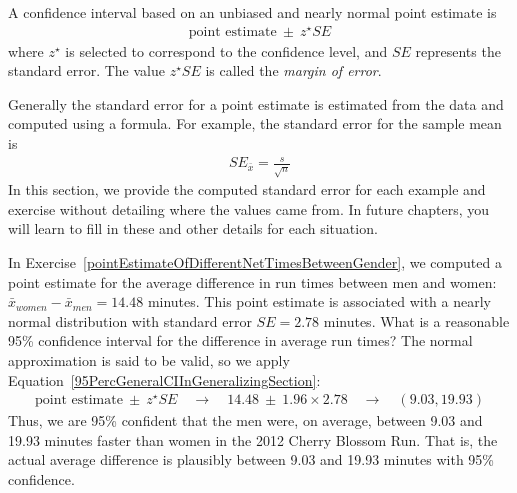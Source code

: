 {\begin{termBox}{\label{generalConfidenceIntervalTermBox}%
A confidence interval based on an unbiased and nearly normal point estimate is
\begin{eqnarray}
\text{point estimate}\ \pm\ z^{\star}SE
\label{95PercGeneralCIInGeneralizingSection}
\end{eqnarray}
where $z^{\star}$ is selected to correspond to the confidence level, and $SE$ represents the standard error. The value $z^{\star}SE$ is called the \emph{margin of error}.}
\end{termBox}

Generally the standard error for a point estimate is estimated from the data and computed using a formula. For example, the standard error for the sample mean is
\begin{eqnarray*}
SE_{\bar{x}} = \frac{s}{\sqrt{n}}
\end{eqnarray*}
In this section, we provide the computed standard error for each example and exercise without detailing where the values came from. In future chapters, you will learn to fill in these and other details for each situation.

\begin{example}{In Exercise~\vref{pointEstimateOfDifferentNetTimesBetweenGender}, we computed a point estimate for the average difference in run times between men and women: $\bar{x}_{women}-\bar{x}_{men}=14.48$ minutes. This point estimate is associated with a nearly normal distribution with standard error $SE=2.78$ minutes. What is a reasonable 95\% confidence interval for the difference in average run times?}
\label{confIntervalForDifferenceOfRunTimeBetweenGenders}
The normal approximation is said to be valid, so we apply Equation~\eqref{95PercGeneralCIInGeneralizingSection}:
\begin{eqnarray*}
\text{point estimate}\ \pm\ z^{\star} SE
	\quad\rightarrow\quad 14.48\ \pm\ 1.96\times 2.78
	\quad\rightarrow\quad (9.03, 19.93)
\end{eqnarray*}
Thus, we are 95\% confident that the men were, on average, between 9.03 and 19.93 minutes faster than women in the 2012 Cherry Blossom Run. That is, the actual average difference is plausibly between 9.03 and 19.93 minutes with 95\% confidence.
\end{example}


}
